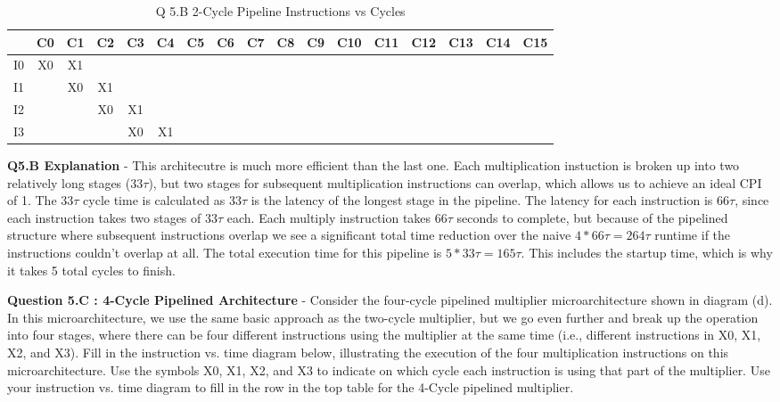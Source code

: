 \documentclass[a4paper,11pt]{article}
\begin{document}
\begin{table}[H]
\caption{Q 5.B 2-Cycle Pipeline Instructions vs Cycles}
\begin{center}
\begin{tabular}{|c|c|c|c|c|c|c|c|c|c|c|c|c|c|c|c|c|} \hline
     & C0 & C1 & C2 & C3 & C4 & C5 & C6 & C7 & C8 & C9 & C10 & C11 & C12 & C13 & C14 & C15  \\ \hline
  I0 & X0 & X1 &    &    &    &    &    &    &    &     &     &     &     &     &    &      \\ \hline   
  I1 &    & X0 & X1 &    &    &    &    &    &    &     &     &     &     &     &    &      \\ \hline   
  I2 &    &    & X0 & X1 &    &    &    &    &    &     &     &     &     &     &    &      \\ \hline   
  I3 &    &    &    & X0 & X1 &    &    &    &    &     &     &     &     &     &    &      \\ \hline   
\end{tabular}
\end{center}
\end{table}

\textbf{Q5.B Explanation} - This architecutre is much more efficient than the last one. Each multiplication instuction is broken up into two relatively long stages ($33\tau$), but two stages for subsequent multiplication instructions can overlap, which allows us to achieve an ideal CPI of 1. The $33\tau$ cycle time is calculated as $33\tau$ is the latency of the longest stage in the pipeline. The latency for each instruction is $66\tau$, since each instruction takes two stages of $33\tau$ each. Each multiply instruction takes $66\tau$ seconds to complete, but because of the pipelined structure where subsequent instructions overlap we see a significant total time reduction over the naive $4*66\tau = 264\tau$ runtime if the instructions couldn't overlap at all. The total execution time for this pipeline is $5*33\tau = 165\tau$. This includes the startup time, which is why it takes 5 total cycles to finish. 


\item \textbf{Question 5.C : 4-Cycle Pipelined Architecture} - Consider the four-cycle pipelined multiplier microarchitecture shown in diagram (d). In this microarchitecture, we use the same basic approach as the two-cycle multiplier, but we go even further and break up the operation into four stages, where there can be four different instructions using the multiplier at the same time (i.e., different instructions in X0, X1, X2, and X3). Fill in the instruction vs. time diagram below, illustrating the execution of the four multiplication instructions on this microarchitecture. Use the symbols X0, X1, X2, and X3 to indicate on which cycle each instruction is using that part of the multiplier. Use your instruction vs. time diagram to fill in the row in the top table for the 4-Cycle pipelined multiplier.
\end{document}
